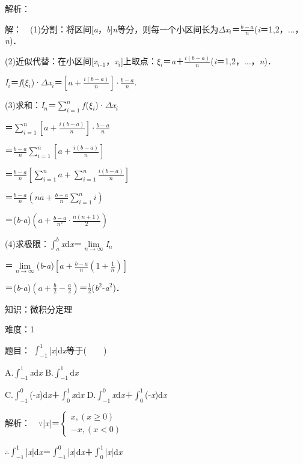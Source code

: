 \documentclass{article} %
\begin{document}
 解析：

 解：　(1)分割：将区间[\textit{a}，\textit{b}]\textit{n}等分，则每一个小区间长为$\Delta$\textit{x${}_{i}$}＝$\frac{b-a}{n}$(\textit{i}＝1,2，{$\dots$}，\textit{n})．

(2)近似代替：在小区间[\textit{x${}_{i}$}${}_{\textrm{-}}$${}_{1}$，\textit{x${}_{i}$}]上取点：\textit{$\xi$${}_{i}$}＝\textit{a}＋$\frac{i(b-a)}{n}$(\textit{i}＝1,2，{$\dots$}，\textit{n})．

\textit{I${}_{i}$}＝\textit{f}(\textit{$\xi$${}_{i}$})·$\Delta$\textit{x${}_{i}$}＝$[a+\frac{i(b-a)}{n}]\cdot\frac{b-a}{n}$.

(3)求和：\textit{I${}_{n}$}＝$\sum\limits_{i=1}^nf$(\textit{$\xi$${}_{i}$})·$\Delta$\textit{x${}_{i}$}

＝$\sum\limits_{i=1}^n[a+\frac{i(b-a)}{n}]\cdot\frac{b-a}{n}$

＝$\frac{b-a}{n}\sum\limits_{i=1}^n[a+\frac{i(b-a)}{n}]$

＝$\frac{b-a}{n}[\sum\limits_{i=1}^n a+\sum\limits_{i=1}^n \frac{i(b-a)}{n}]$

＝$\frac{b-a}{n}(na+\frac{b-a}{n}\sum\limits_{i=1}^n i)$

＝(\textit{b}-\textit{a})$(a+\frac{b-a}{n^2}\cdot\frac{n(n+1)}{2})$

(4)求极限：$\int_a^b$\textit{x}d\textit{x}＝$\lim\limits_{n\rightarrow \infty}$\textit{I${}_{n}$}

＝$\lim\limits_{n\rightarrow \infty}$(\textit{b}-\textit{a})$[a+\frac{b-a}{n}(1+\frac{1}{n})]$

＝(\textit{b}-\textit{a})$(a+\frac{b}{2}-\frac{a}{2})$＝$\frac{1}{2}$(\textit{b}${}^{2}$-\textit{a}${}^{2}$)．

 

 知识：微积分定理

 难度：1

 题目：   $\int_{-1}^{1}$|\textit{x}|d\textit{x}等于(　　)

A.$\int_{-1}^1$\textit{x}d\textit{x}       B.$\int_{-1}^{1}$d\textit{x}

C.$\int_{-1}^0$(-\textit{x})d\textit{x}＋$\int_{0}^{1}$\textit{x}d\textit{x}    D.$\int_{-1}^{0}$\textit{x}d\textit{x}＋$\int_{0}^{1}$(-\textit{x})d\textit{x}

 解析：　$\mathrm{\because}$|\textit{x}|＝$\left\{\begin{array}{l} x, (x\ge 0)\\ -x, (x<0) \end{array}\right.$

$\mathrm{\therefore}$$\int_{-1}^{1}$|\textit{x}|d\textit{x}＝$\int_{-1}^{0}$|\textit{x}|d\textit{x}＋$\int_{0}^{1}$|\textit{x}|d\textit{x}
\end{document}
